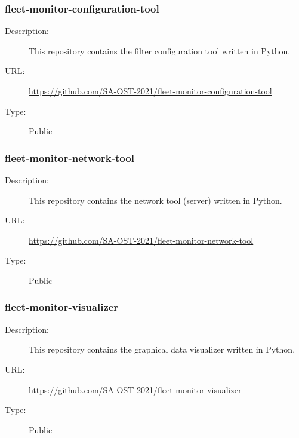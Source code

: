 \subsubsection{fleet-monitor-configuration-tool} \vspace{-0.2cm}
\begin{description}
  \item[Description:] This repository contains the filter configuration tool written in Python.\vspace{-0.25cm}
  \item[URL:] \url{https://github.com/SA-OST-2021/fleet-monitor-configuration-tool}\vspace{-0.25cm}
  \item[Type:] Public\vspace{-0.25cm}
\end{description}

\subsubsection{fleet-monitor-network-tool} \vspace{-0.2cm}
\begin{description}
  \item[Description:] This repository contains the network tool (server) written in Python.\vspace{-0.25cm}
  \item[URL:] \url{https://github.com/SA-OST-2021/fleet-monitor-network-tool}\vspace{-0.25cm}
  \item[Type:] Public\vspace{-0.25cm}
\end{description}

\subsubsection{fleet-monitor-visualizer} \vspace{-0.2cm}
\begin{description}
  \item[Description:] This repository contains the graphical data visualizer written in Python.\vspace{-0.25cm}
  \item[URL:] \url{https://github.com/SA-OST-2021/fleet-monitor-visualizer}\vspace{-0.25cm}
  \item[Type:] Public\vspace{-0.25cm}
\end{description}
